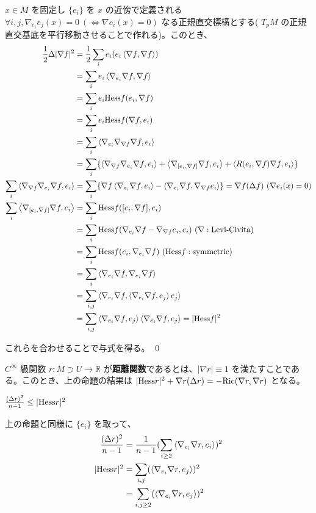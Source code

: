 \documentclass[dvipdfmx,a4paper]{jsreport}
\theoremstyle{definition}
\newcommand{\Ric}{{\rm Ric}}
\newcommand{\Hess}{{\rm Hess}}
\newcommand{\R}{\mathbb{R}}
\begin{document}
\prf $x \in M$ を固定し $\{e_i\}$ を $x$ の近傍で定義される $\forall i,j,\nabla_{e_i}e_j(x)=0\ (\iff \nabla e_i(x)=0)$ なる正規直交標構とする( $T_pM$ の正規直交基底を平行移動させることで作れる)。このとき、
\begin{align*}
    {1 \over 2}\Delta|\nabla f|^2 &= {1 \over 2} \sum_i e_i(e_i \ev{\nabla f,\nabla f}) \\
    &= \sum_i e_i \ev{\nabla_{e_i}\nabla f,\nabla f} \\
    &= \sum_i e_i \Hess f(e_i,\nabla f) \\
    &= \sum_i e_i \Hess f(\nabla f,e_i) \\
    &= \sum_i \ev{\nabla_{e_i}\nabla_{\nabla f}\nabla f,e_i} \\
    &= \sum_i \{\ev{\nabla_{\nabla f}\nabla_{e_i}\nabla f,e_i}+\ev{\nabla_{[e_i,\nabla f]}\nabla f,e_i}+\ev{R(e_i,\nabla f)\nabla f,e_i}\} \\
    \sum_i \ev{\nabla_{\nabla f}\nabla_{e_i}\nabla f,e_i} &= \sum_i \{\nabla f\ev{\nabla_{e_i}\nabla f,e_i}-\ev{\nabla_{e_i}\nabla f,\nabla_{\nabla f}e_i}\}= \nabla f(\Delta f)\ (\nabla e_i(x)=0) \\
    \sum_i \ev{\nabla_{[e_i,\nabla f]}\nabla f,e_i} &= \sum_i \Hess f([e_i,\nabla f],e_i) \\
    &= \sum_i \Hess f(\nabla_{e_i} \nabla f-\nabla_{\nabla f}e_i,e_i)\ (\nabla:\mbox{Levi-Civita}) \\
    &= \sum_i \Hess f(e_i,\nabla_{e_i} \nabla f)\ (\Hess f:\mbox{symmetric}) \\
    &= \sum_i \ev{\nabla_{e_i} \nabla f,\nabla_{e_i} \nabla f} \\
    &= \sum_{i,j} \ev{\nabla_{e_i} \nabla f,\ev{\nabla_{e_i} \nabla f,e_j}e_j} \\
    &= \sum_{i,j} \ev{\nabla_{e_i} \nabla f,e_j}\ev{\nabla_{e_i} \nabla f,e_j} =|\Hess f|^2
\end{align*}

これらを合わせることで与式を得る。 \qed

 $C^\infty$ 級関数 $r:M \supset U \to \R$ が\textbf{距離関数}であるとは、$|\nabla r| \equiv 1$ を満たすことである。このとき、上の命題の結果は $|\Hess r|^2+\nabla r(\Delta r)=-\Ric(\nabla r,\nabla r)$ となる。

\lem ${(\Delta r)^2 \over n-1} \leq |\Hess r|^2$ 

\prf 上の命題と同様に $\{e_i\}$ を取って、
\begin{align*}
    {(\Delta r)^2 \over n-1} &= {1 \over n-1}(\sum_{i \geq 2}\ev{\nabla_{e_i}\nabla r,e_i})^2 \\
    |\Hess r|^2 &= \sum_{i,j} (\ev{\nabla_{e_i}\nabla r,e_j})^2 \\
    &= \sum_{i,j \geq 2} (\ev{\nabla_{e_i}\nabla r,e_j})^2
\end{align*}
\end{document}
